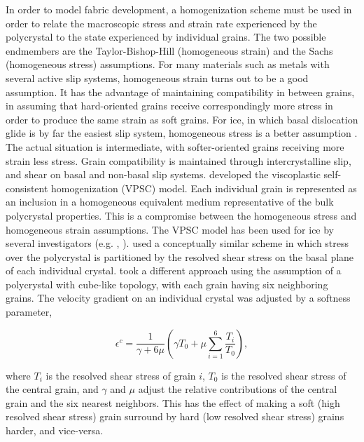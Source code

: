 \documentclass[TC, hvmath, online]{copernicus}
\begin{document}
In order to model fabric development, a homogenization scheme must be used in order to relate the macroscopic stress and strain rate experienced by the polycrystal to the state experienced by individual grains. The two possible endmembers are the Taylor-Bishop-Hill (homogeneous strain) \citep{taylor} and the Sachs (homogeneous stress) \citep{sachs} assumptions. For many materials such as metals with several active slip systems, homogeneous strain turns out to be a good assumption. It has the advantage of maintaining compatibility in between grains, in assuming that hard-oriented grains receive correspondingly more stress in order to produce the same strain as soft grains. For ice, in which basal dislocation glide is by far the easiest slip system, homogeneous stress is a better assumption \citep{thorsteinsson2002nni}. The actual situation is intermediate, with softer-oriented grains receiving more strain less stress. Grain compatibility is maintained through intercrystalline slip, and shear on basal and non-basal slip systems. \citet{molinari} developed the viscoplastic self-consistent homogenization (VPSC) model. Each individual grain is represented as an inclusion in a homogeneous equivalent medium representative of the bulk polycrystal properties. This is a compromise between the homogeneous stress and homogeneous strain assumptions. The VPSC model has been used for ice by several investigators (e.g. \citet{gillet2005}, \citet{castelnau1997}). \citet{azuma96} used a conceptually similar scheme in which stress over the polycrystal is partitioned by the resolved shear stress on the basal plane of each individual crystal. \citet{thorsteinsson2002nni} took a different approach using the assumption of a polycrystal with cube-like topology, with each grain having six neighboring grains. The velocity gradient on an individual crystal was adjusted by a softness parameter,

\[\epsilon^c = \frac {1}{\gamma + 6 \mu} \left( \gamma T_0 + \mu \sum_{i=1}^6 \frac{T_i}{T_0} \right), \]

where $T_i$ is the resolved shear stress of grain $i$, $T_0$ is the resolved shear stress of the central grain, and $\gamma$ and $\mu$ adjust the relative contributions of the central grain and the six nearest neighbors. This has the effect of making a soft (high resolved shear stress) grain surround by hard (low resolved shear stress) grains harder, and vice-versa.
\end{document}
